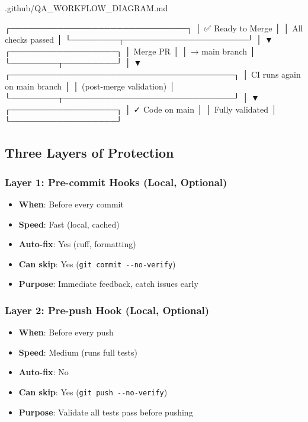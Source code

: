 \begin{relocated}{.github/QA_WORKFLOW_DIAGRAM.md}
\begin{logblock}
    ┌──────────────────────────────┐
    │  ✅ Ready to Merge           │
    │  All checks passed           │
    └────────┬─────────────────────┘
             │
             ▼
    ┌──────────────────┐
    │  Merge PR        │
    │  → main branch   │
    └────────┬─────────┘
             │
             ▼
    ┌──────────────────────────────────────┐
    │  CI runs again on main branch        │
    │  (post-merge validation)             │
    └────────┬─────────────────────────────┘
             │
             ▼
    ┌──────────────────┐
    │  ✓ Code on main  │
    │  Fully validated │
    └──────────────────┘
\end{logblock}

\subsection{Three Layers of Protection}\label{um:flow:qa-workflow-diagram:three-layers-of-protection}

\subsubsection{Layer 1: Pre-commit Hooks (Local, Optional)}\label{um:flow:qa-workflow-diagram:layer-1-pre-commit-hooks-local-optional}

\begin{itemize}
\tightlist
\item
  \textbf{When}: Before every commit
\item
  \textbf{Speed}: Fast (local, cached)
\item
  \textbf{Auto-fix}: Yes (ruff, formatting)
\item
  \textbf{Can skip}: Yes
  (\texttt{git\ commit\ -\allowbreak{}-\allowbreak{}no-\allowbreak{}verify})
\item
  \textbf{Purpose}: Immediate feedback, catch issues early
\end{itemize}

\subsubsection{Layer 2: Pre-push Hook (Local, Optional)}\label{um:flow:qa-workflow-diagram:layer-2-pre-push-hook-local-optional}

\begin{itemize}
\tightlist
\item
  \textbf{When}: Before every push
\item
  \textbf{Speed}: Medium (runs full tests)
\item
  \textbf{Auto-fix}: No
\item
  \textbf{Can skip}: Yes
  (\texttt{git\ push\ -\allowbreak{}-\allowbreak{}no-\allowbreak{}verify})
\item
  \textbf{Purpose}: Validate all tests pass before pushing
\end{itemize}


\end{relocated}
